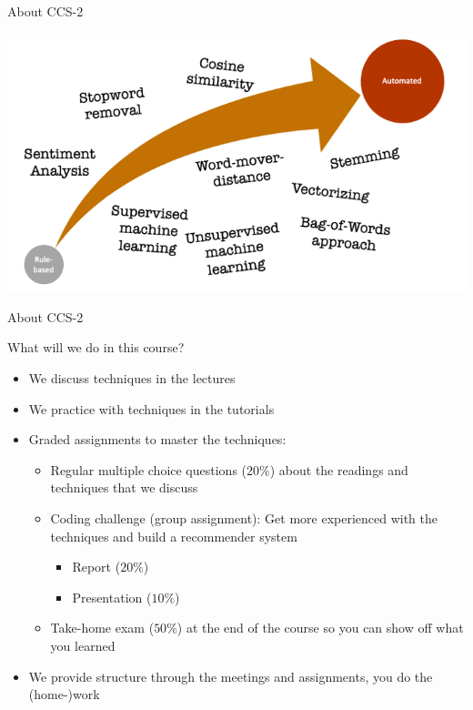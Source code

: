 \documentclass[handout]{beamer}
\begin{document}
\begin{frame}{About CCS-2}
	
	\begin{center}
		\includegraphics[width=\linewidth,height=\textheight,keepaspectratio]{../pictures/Roadmap_terms.png} 
	\end{center}
	
\end{frame}


\begin{frame}{About CCS-2} 

What will we do in this course?	
	\begin{itemize}
		\item We discuss techniques in the lectures
		\item We practice with techniques in the tutorials
		\item Graded assignments to master the techniques:
		\begin{itemize}
			\item Regular multiple choice questions (\(20\%\)) about the readings and techniques that we discuss
			\item Coding challenge (group assignment): Get more experienced with the techniques and build a recommender system
			\begin{itemize}
				\item Report (\(20\%\))
				\item Presentation (\(10\%\))
			\end{itemize}
			\item Take-home exam (\(50\%\)) at the end of the course so you can show off what you learned
		\end{itemize}
		\item We provide structure through the meetings and assignments, you do the (home-)work
	\end{itemize}
	
\end{frame}
\end{document}
